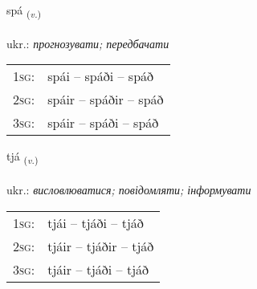 \documentclass[frontgrid, backgrid]{flacards}\usepackage[]{graphicx}\usepackage[]{xcolor}
\begin{document}
\renewcommand{\flhead}{\vskip5pt \fboxsep=0pt {\small\bfseries\footnotesize Sagnorð | дієслово}}
\renewcommand{\fcfoot}{\vskip5pt \fboxsep=0pt \hspace{2pt}{\small\bfseries\footnotesize 2K}}

\renewcommand{\blhead}{\vskip5pt {\small\bfseries\footnotesize Sagnorð | дієслово }}
\renewcommand{\bcfoot}{\vskip5pt \hspace{2pt}{\small\bfseries\footnotesize 2K}}


{spá \small{\textsubscript{(\textit{v.})}} \\[1ex] %
\textphonetic{[spauː]} \\
ukr.: \emph{прогнозувати; передбачати} \\  [2ex]
\renewcommand*{\arraystretch}{0.8}
\begin{tabular}{p{1cm}l}
\textsc{1sg}: & spái -- spáði -- spáð \\ 
\textsc{2sg}: & spáir -- spáðir -- spáð \\ 
\textsc{3sg}: & spáir -- spáði -- spáð \\ 
\end{tabular}
}

\renewcommand{\flhead}{\vskip5pt \fboxsep=0pt {\small\bfseries\footnotesize Sagnorð | дієслово}}
\renewcommand{\fcfoot}{\vskip5pt \fboxsep=0pt \hspace{2pt}{\small\bfseries\footnotesize 2K}}

\renewcommand{\blhead}{\vskip5pt {\small\bfseries\footnotesize Sagnorð | дієслово }}
\renewcommand{\bcfoot}{\vskip5pt \hspace{2pt}{\small\bfseries\footnotesize 2K}}


{tjá \small{\textsubscript{(\textit{v.})}} \\[1ex] %
\textphonetic{[tʰjauː]} \\
ukr.: \emph{висловлюватися; повідомляти; інформувати} \\  [2ex]
\renewcommand*{\arraystretch}{0.8}
\begin{tabular}{p{1cm}l}
\textsc{1sg}: & tjái -- tjáði -- tjáð \\ 
\textsc{2sg}: & tjáir -- tjáðir -- tjáð \\ 
\textsc{3sg}: & tjáir -- tjáði -- tjáð \\ 
\end{tabular}
}
\end{document}
